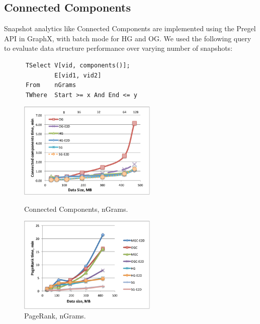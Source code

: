 \subsection{Connected Components}

Snapshot analytics like Connected Components are implemented using the
Pregel API in GraphX, with batch mode for HG and OG.  We used the
following query to evaluate data structure performance over varying
number of snapshots:

\begin{small}
\begin{verbatim}
      TSelect V[vid, components()];
              E[vid1, vid2]
      From    nGrams
      TWhere  Start >= x And End <= y
\end{verbatim}
\end{small}

\begin{figure}[t]
\centering
\begin{minipage}{3in}
  \centering
  \includegraphics[width=2.6in]{figs/connectedcs_ngrams.pdf}
  \vspace{-0.1in}
  \caption{Connected Components, nGrams.}
  \label{fig:connectc_ngrams}
  \vspace{-0.1in}
\end{minipage}
\begin{minipage}{3in}
  \centering
\includegraphics[width=2.6in]{figs/pagerank_ngrams.pdf}
  \vspace{-0.1in}
\caption{PageRank, nGrams.}
\label{fig:pagerank_ngrams}
  \vspace{-0.1in}
\end{minipage}
\end{figure}

